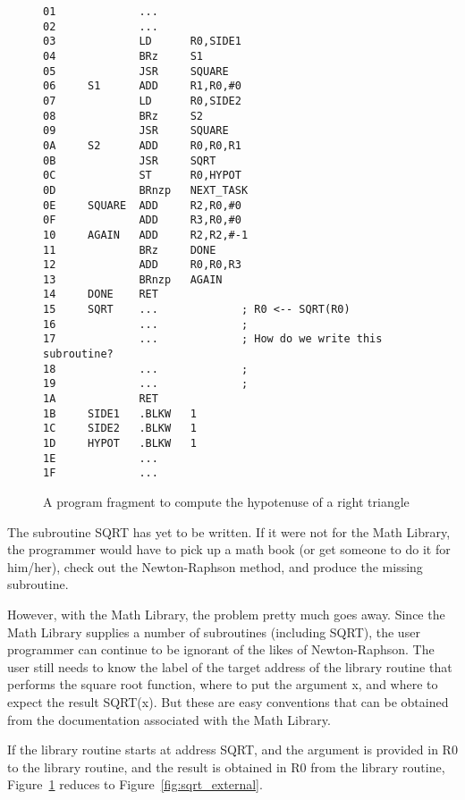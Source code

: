 \documentclass{patt}
\begin{document}
\begin{figure}[h]
\begin{Verbatim}[fontsize=\fontsize{9}{10}\selectfont]
01             ...
02             ...
03             LD      R0,SIDE1
04             BRz     S1
05             JSR     SQUARE
06     S1      ADD     R1,R0,#0
07             LD      R0,SIDE2
08             BRz     S2
09             JSR     SQUARE
0A     S2      ADD     R0,R0,R1
0B             JSR     SQRT
0C             ST      R0,HYPOT
0D             BRnzp   NEXT_TASK
0E     SQUARE  ADD     R2,R0,#0
0F             ADD     R3,R0,#0
10     AGAIN   ADD     R2,R2,#-1
11             BRz     DONE
12             ADD     R0,R0,R3
13             BRnzp   AGAIN
14     DONE    RET
15     SQRT    ...             ; R0 <-- SQRT(R0)
16             ...             ;
17             ...             ; How do we write this subroutine?
18             ...             ;
19             ...             ;
1A             RET
1B     SIDE1   .BLKW   1
1C     SIDE2   .BLKW   1
1D     HYPOT   .BLKW   1
1E             ...
1F             ...
\end{Verbatim}
\caption{A program fragment to compute the hypotenuse of a right triangle}
\label{fig:sqrt_internal}
\end{figure}

The subroutine SQRT has yet to be written. If it were not for the Math
Library, the programmer would have to pick up a math book (or get
someone to do it for him/her), check out the Newton-Raphson method,
and produce the missing subroutine.

However, with the Math Library, the problem pretty much goes away.
Since the Math Library supplies a number of subroutines (including
SQRT), the user programmer can continue to be ignorant of the likes of
Newton-Raphson.  The user still needs to know the label of the target
address of the library routine that performs the square root function,
where to put the argument x, and where to expect the result SQRT(x).
But these are easy conventions that can be obtained from the
documentation associated with the Math Library.

If the library routine starts at address SQRT, and the argument is
provided in R0 to the library routine, and the result is obtained in R0
from the library routine, Figure~\ref{fig:sqrt_internal} reduces to
Figure~\ref{fig:sqrt_external}.
\end{document}
